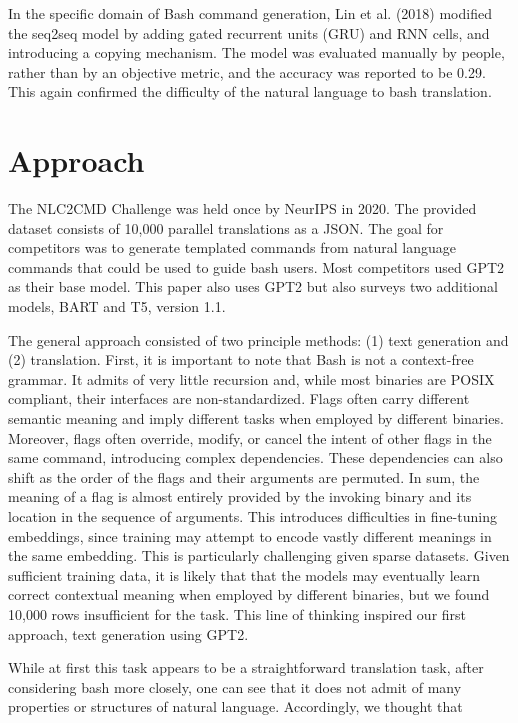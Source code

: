 \documentclass{article}
\begin{document}
In the specific domain of Bash command generation, Lin et al. (2018) \cite{lin2018nl2bash} modified the seq2seq model by adding gated recurrent units (GRU) and RNN cells, and introducing a copying mechanism. The model was evaluated manually by people, rather than by an objective metric, and the accuracy was reported to be 0.29. This again confirmed the difficulty of the natural language to bash translation.

\color{red}
\section{Approach}
\color{black}
The NLC2CMD Challenge was held once by NeurIPS in 2020. The provided dataset
consists of 10,000 parallel translations as a JSON. The goal for competitors
was to generate templated commands from natural language commands that could be
used to guide bash users. Most competitors used GPT2 as their base model. This
paper also uses GPT2 but also surveys two additional models, BART and T5,
version 1.1.
\par
The general approach consisted of two principle methods: (1) text generation
and (2) translation. First, it is important to note that Bash is not a
context-free grammar. It admits of very little recursion and, while most
binaries are POSIX compliant, their interfaces are non-standardized. Flags
often carry different semantic meaning and imply different tasks when employed
by different binaries. Moreover, flags often override, modify, or cancel the
intent of other flags in the same command, introducing complex dependencies.
These dependencies can also shift as the order of the flags and their arguments
are permuted. In sum, the meaning of a flag is almost entirely provided by the
invoking binary and its location in the sequence of arguments. This introduces
difficulties in fine-tuning embeddings, since training may attempt to encode
vastly different meanings in the same embedding. This is particularly
challenging given sparse datasets. Given sufficient training data, it is likely
that that the models may eventually learn correct contextual meaning when
employed by different binaries, but we found 10,000 rows insufficient for the
task. This line of thinking inspired our first approach, text generation using
GPT2.
\par
While at first this task appears to be a straightforward translation task,
after considering bash more closely, one can see that it does not admit of many
properties or structures of natural language. Accordingly, we thought that
\end{document}
